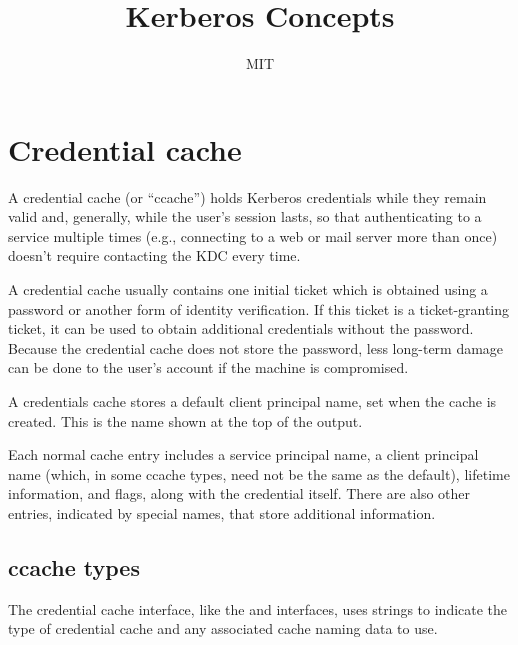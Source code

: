 \documentclass[letterpaper,10pt,english]{sphinxmanual}
\title{Kerberos Concepts}
\date{ }
\author{MIT}
\begin{document}
\maketitle
\sphinxtableofcontents
{}\label{\detokenize{basic/index::doc}}



\chapter{Credential cache}
\label{\detokenize{basic/ccache_def:basic-concepts}}\label{\detokenize{basic/ccache_def::doc}}\label{\detokenize{basic/ccache_def:credential-cache}}\label{\detokenize{basic/ccache_def:ccache-definition}}\label{\detokenize{basic/ccache_def:kerberos-v5-concepts}}
A credential cache (or “ccache”) holds Kerberos credentials while they
remain valid and, generally, while the user’s session lasts, so that
authenticating to a service multiple times (e.g., connecting to a web
or mail server more than once) doesn’t require contacting the KDC
every time.

A credential cache usually contains one initial ticket which is
obtained using a password or another form of identity verification.
If this ticket is a ticket-granting ticket, it can be used to obtain
additional credentials without the password.  Because the credential
cache does not store the password, less long-term damage can be done
to the user’s account if the machine is compromised.

A credentials cache stores a default client principal name, set when
the cache is created.  This is the name shown at the top of the
  output.

Each normal cache entry includes a service principal name, a client
principal name (which, in some ccache types, need not be the same as
the default), lifetime information, and flags, along with the
credential itself.  There are also other entries, indicated by special
names, that store additional information.


\section{ccache types}
\label{\detokenize{basic/ccache_def:ccache-types}}
The credential cache interface, like the {\hyperref[\detokenize{basic/keytab_def:keytab-definition}]{}} and
{\hyperref[\detokenize{basic/rcache_def:rcache-definition}]{}} interfaces, uses  strings to
indicate the type of credential cache and any associated cache naming
data to use.
\end{document}
